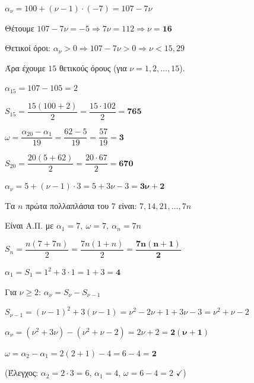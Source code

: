 \documentclass[11pt,a4paper,modern]{FFExercises}
\begin{document}
\lysh[21]
\begin{alist}
\item $\alpha_{\nu}=100+(\nu-1)\cdot(-7)=107-7\nu$

Θέτουμε $107-7\nu=-5 \Rightarrow 7\nu=112 \Rightarrow \nu=\boldsymbol{16}$

\item Θετικοί όροι: $\alpha_{\nu}>0 \Rightarrow 107-7\nu>0 \Rightarrow \nu<15{,}29$

Άρα έχουμε $15$ θετικούς όρους (για $\nu=1,2,\ldots,15$).

$\alpha_{15}=107-105=2$

$S_{15}=\dfrac{15(100+2)}{2}=\dfrac{15\cdot 102}{2}=\boldsymbol{765}$
\end{alist}

\lysh[22]
\begin{alist}
\item $\omega=\dfrac{\alpha_{20}-\alpha_1}{19}=\dfrac{62-5}{19}=\dfrac{57}{19}=\boldsymbol{3}$

\item $S_{20}=\dfrac{20(5+62)}{2}=\dfrac{20\cdot 67}{2}=\boldsymbol{670}$

\item $\alpha_{\nu}=5+(\nu-1)\cdot 3=5+3\nu-3=\boldsymbol{3\nu+2}$
\end{alist}

\lysh[23]
Τα $n$ πρώτα πολλαπλάσια του $7$ είναι: $7, 14, 21, \ldots, 7n$

Είναι Α.Π. με $\alpha_1=7,\ \omega=7,\ \alpha_n=7n$

$S_n=\dfrac{n(7+7n)}{2}=\dfrac{7n(1+n)}{2}=\boldsymbol{\dfrac{7n(n+1)}{2}}$

\lysh[24]
\begin{alist}
\item $\alpha_1=S_1=1^2+3\cdot 1=1+3=\boldsymbol{4}$

\item Για $\nu\geq 2$: $\alpha_{\nu}=S_{\nu}-S_{\nu-1}$

$S_{\nu-1}=(\nu-1)^2+3(\nu-1)=\nu^2-2\nu+1+3\nu-3=\nu^2+\nu-2$

$\alpha_{\nu}=(\nu^2+3\nu)-(\nu^2+\nu-2)=2\nu+2=\boldsymbol{2(\nu+1)}$

\item $\omega=\alpha_2-\alpha_1=2(2+1)-4=6-4=\boldsymbol{2}$

(Έλεγχος: $\alpha_2=2\cdot 3=6$, $\alpha_1=4$, $\omega=6-4=2$ $\checkmark$)
\end{alist}
\end{document}
